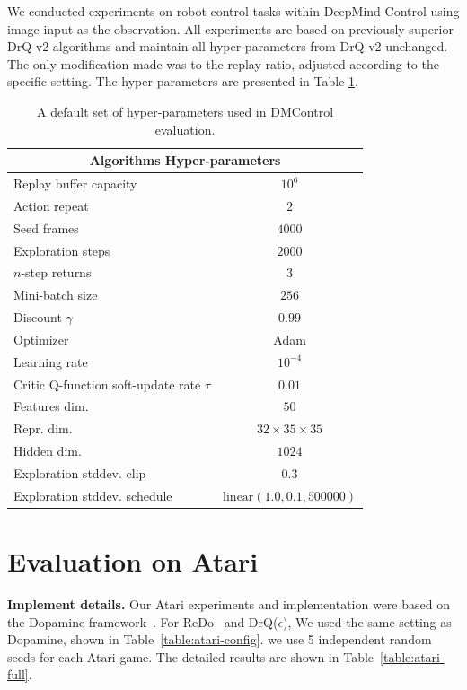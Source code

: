 We conducted experiments on robot control tasks within DeepMind Control using image input as the observation. All experiments are based on previously superior DrQ-v2 algorithms and maintain all hyper-parameters from DrQ-v2 unchanged. The only modification made was to the replay ratio, adjusted according to the specific setting.  The hyper-parameters are presented in Table \ref{table:DMC}.
\begin{table}[htbp] 
\caption{ A default set of hyper-parameters used in DMControl evaluation.}
\renewcommand{\arraystretch}{1.15}
\centering
\begin{tabular}{lc}
\toprule
\multicolumn{2}{c}{Algorithms Hyper-parameters} \\
\midrule
Replay buffer capacity & $10^6$ \\
Action repeat & $2$ \\
Seed frames & $4000$ \\
Exploration steps & $2000$ \\
$n$-step returns & $3$ \\
Mini-batch size & $256$ \\
Discount $\gamma$ & $0.99$ \\
Optimizer & Adam \\
Learning rate & $10^{-4}$ \\
Critic Q-function soft-update rate $\tau$ & $0.01$ \\
Features dim. & $50$ \\
Repr. dim. & $32 \times 35 \times 35$ \\
Hidden dim. & $1024$ \\
Exploration stddev. clip & $0.3$ \\
Exploration stddev. schedule & $\mathrm{linear}(1.0, 0.1, 500000)$\\ 
\bottomrule
\end{tabular}
\label{table:DMC}
\end{table}

\newpage
\section{Evaluation on Atari}
\label{Evaluation on Atari}

\textbf{Implement details.} Our Atari experiments and implementation were based on the Dopamine framework~\citep{castro18dopamine}. For ReDo~\citep{dormant_neuron} and DrQ($\epsilon$), We used the same setting as Dopamine, shown in Table~\ref{table:atari-config}. we use 5 independent random seeds for each Atari game. The detailed results are shown in Table~\ref{table:atari-full}.

